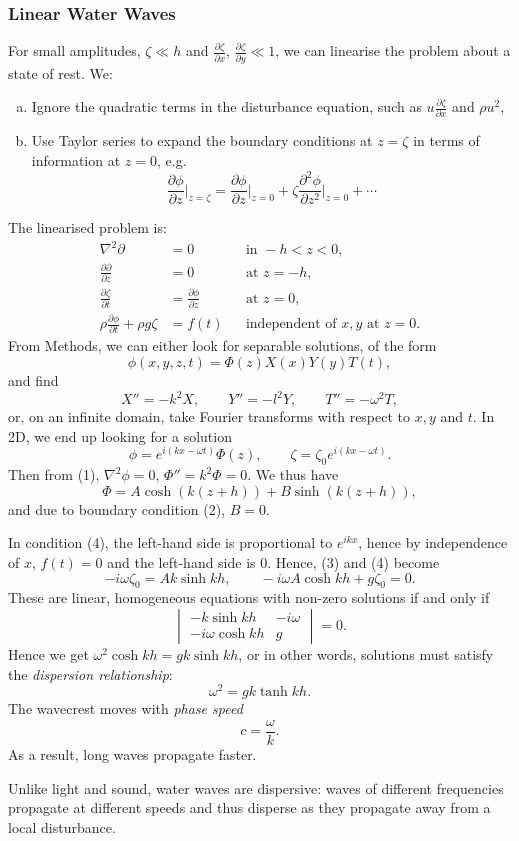 \documentclass[12pt]{article}
\begin{document}
\subsubsection{Linear Water Waves}
\label{subsub:linear_water_waves}

For small amplitudes, $\zeta \ll h$ and $\frac{\partial \zeta}{\partial x}$, $\frac{\partial \zeta}{\partial y} \ll 1$, we can linearise the problem about a state of rest. We:
\begin{enumerate}[(a)]
	\item Ignore the quadratic terms in the disturbance equation, such as $u \frac{\partial \zeta}{\partial x}$ and $\rho u^2$,
	\item Use Taylor series to expand the boundary conditions at $z = \zeta$ in terms of information at $z = 0$, e.g.
		\[
		\frac{\partial \phi}{\partial z} \biggr|_{z = \zeta} = \frac{\partial \phi}{\partial z} \biggr|_{z = 0} + \zeta \frac{\partial^2 \phi}{\partial z^2} \biggr|_{z = 0} + \cdots
		\]
\end{enumerate}
The linearised problem is:
\begin{align*}
	\nabla^2 \partial &= 0 & &\text{in } -h < z < 0, \tag{1} \\
	\frac{\partial \partial}{\partial z} &= 0 & &\text{at } z = -h, \tag{2} \\
	\frac{\partial \zeta}{\partial t} &= \frac{\partial \phi}{\partial z} & &\text{at } z = 0, \tag{3} \\
	\rho \frac{\partial \phi}{\partial t} + \rho g \zeta &= f(t) & &\text{independent of } x, y \text{ at } z = 0. \tag{4}
\end{align*}
From Methods, we can either look for separable solutions, of the form
\[
\phi(x, y, z, t) = \Phi(z) X(x) Y(y) T(t),
\]
and find
\[
X'' = -k^2 X, \qquad Y'' = -l^2 Y, \qquad T'' = - \omega^2 T,
\]
or, on an infinite domain, take Fourier transforms with respect to $x, y$ and $t$. In 2D, we end up looking for a solution
\[
\phi = e^{i(kx - \omega t)}\Phi(z), \qquad \zeta = \zeta_0 e^{i(kx - \omega t)}.
\]
Then from (1), $\nabla^2 \phi = 0$, $\Phi'' = k^2 \Phi = 0$. We thus have
\[
\Phi = A \cosh (k(z+h)) + B \sinh (k(z+h)),
\]
and due to boundary condition (2), $B = 0$.

In condition (4), the left-hand side is proportional to $e^{ikx}$, hence by independence of $x$, $f(t) = 0$ and the left-hand side is $0$. Hence, (3) and (4) become
\[
-i \omega \zeta_0 = Ak\sinh kh, \qquad - i \omega A \cosh kh + g \zeta_0 = 0.
\]
These are linear, homogeneous equations with non-zero solutions if and only if
\[
\begin{vmatrix}
	-k \sinh kh & -i \omega \\  -i \omega \cosh kh & g
\end{vmatrix}
= 0.
\]
Hence we get $\omega^2 \cosh kh = gk \sinh kh$, or in other words, solutions must satisfy the \emph{dispersion relationship}:
\[
\omega^2 = gk \tanh kh.
\]
The wavecrest moves with \emph{phase speed}
\[
c = \frac{\omega}{k}.
\]
As a result, long waves propagate faster.

Unlike light and sound, water waves are dispersive: waves of different frequencies propagate at different speeds and thus disperse as they propagate away from a local disturbance.

\newpage

\printindex
\end{document}
